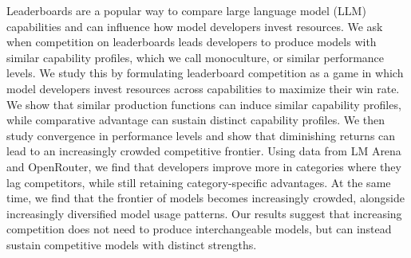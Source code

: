Leaderboards are a popular way to compare large language model (LLM) capabilities and can influence how model developers invest resources.
We ask when competition on leaderboards leads developers to produce models with similar capability profiles, which we call monoculture, or similar performance levels.
We study this by formulating leaderboard competition as a game in which model developers invest resources across capabilities to maximize their win rate.
We show that similar production functions can induce similar capability profiles, while comparative advantage can sustain distinct capability profiles. 
We then study convergence in performance levels and show that diminishing returns can lead to an increasingly crowded competitive frontier.
Using data from LM Arena and OpenRouter, we find that developers improve more in categories where they lag competitors, while still retaining category-specific advantages.
At the same time, we find that the frontier of models becomes increasingly crowded, alongside increasingly diversified model usage patterns. 
Our results suggest that increasing competition does not need to produce interchangeable models, but can instead sustain competitive models with distinct strengths.